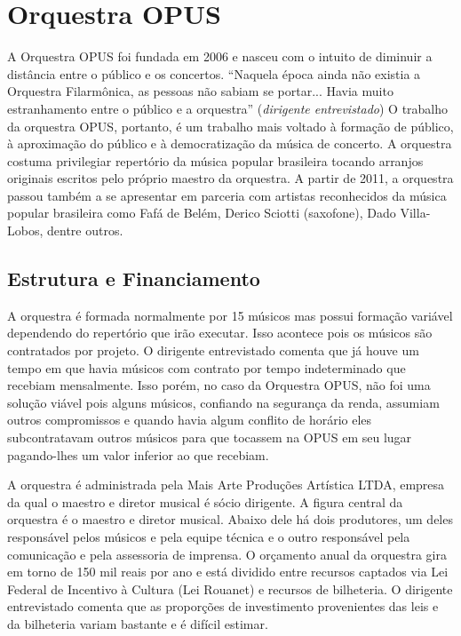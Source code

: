 \documentclass[a4paper, 12pt, openright, oneside, german, french, english, brazil]{abntex2}
\begin{document}
	
	
	
	
	\chapter{Orquestra OPUS}
	
	A Orquestra OPUS foi fundada em 2006 e nasceu com o intuito de diminuir a distância entre o público e os concertos. ``Naquela época ainda não existia a Orquestra Filarmônica, as pessoas não sabiam se portar... Havia muito estranhamento entre o público e a orquestra'' (\textit{dirigente entrevistado}) O trabalho da orquestra OPUS, portanto, é um trabalho mais voltado à formação de público, à aproximação do público e à democratização da música de concerto. A orquestra costuma privilegiar repertório da música popular brasileira tocando arranjos originais escritos pelo próprio maestro da orquestra. A partir de 2011, a orquestra passou também a se apresentar em parceria com artistas reconhecidos da música popular brasileira como Fafá de Belém, Derico Sciotti (saxofone), Dado Villa-Lobos, dentre outros. 
	
	\section{Estrutura e Financiamento}
	
	A orquestra é formada normalmente por 15 músicos mas possui formação variável dependendo do repertório que irão executar. Isso acontece pois os músicos são contratados por projeto. O dirigente entrevistado comenta que já houve um tempo em que havia músicos com contrato por tempo indeterminado que recebiam mensalmente. Isso porém, no caso da Orquestra OPUS, não foi uma solução viável pois alguns músicos, confiando na segurança da renda, assumiam outros compromissos e quando havia algum conflito de horário eles subcontratavam outros músicos para que tocassem na OPUS em seu lugar pagando-lhes um valor inferior ao que recebiam.
	
	A orquestra é administrada pela Mais Arte Produções Artística LTDA, empresa da qual o maestro e diretor musical é sócio dirigente. A figura central da orquestra é o maestro e diretor musical. Abaixo dele há dois produtores, um deles responsável pelos músicos e pela equipe técnica e o outro responsável pela comunicação e pela assessoria de imprensa. O orçamento anual da orquestra gira em torno de 150 mil reais por ano e está dividido entre recursos captados via Lei Federal de Incentivo à Cultura (Lei Rouanet) e recursos de bilheteria. O dirigente entrevistado comenta que as proporções de investimento provenientes das leis e da bilheteria variam bastante e é difícil estimar.
	
\end{document}
